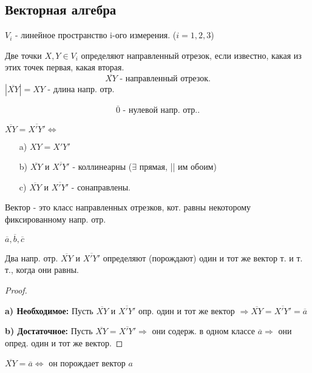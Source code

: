  \subsection{Векторная алгебра}
 
$V_i$ - линейное пространство  i-ого измерения. ($i = 1, 2, 3$)

\begin{definition}
Две точки $X, Y \in V_i$ определяют направленный отрезок, если известно, какая из этих точек первая, какая вторая.
\[
\overline{XY} \text{ - направленный отрезок}
.\] 
$|\overline{XY}| = XY$ - длина напр. отр.
\end{definition}
\begin{symb}
\[
\overline{0} \text{ - нулевой напр. отр.}
.\] 
\end{symb}

\begin{definition}
$\overline{XY} = \overline{X'Y'} \iff $
\begin{itemize}
    \item [a) ] $XY = X'Y'$
    \item [b) ] $\overline{XY}$ и $\overline{X'Y'}$ - коллинеарны ($\exists $ прямая, || им обоим)
    \item [c) ] $\overline{XY} \text{ и } \overline{X'Y'}$ - сонаправлены.
\end{itemize}
\end{definition}

\begin{definition}
Вектор - это класс направленных отрезков, кот. равны некоторому фиксированному напр. отр.
\end{definition}
\begin{symb}
    $\overline{a}, \overline{b}, \overline{c}$
\end{symb}

\begin{statement}
Два напр. отр. $\overline{XY}$ и $\overline{X'Y'}$ определяют (порождают) один и тот же вектор т. и т. т., когда они равны.
\end{statement}
\begin{proof}
~\newline

\textbf{a) Необходимое: } Пусть $\overline{XY}$ и $\overline{X'Y'}$ опр. один и тот же вектор $ \Rightarrow \overline{XY} = \overline{X'Y'} = \overline{a}$
 
\textbf{b) Достаточное: } Пусть $\overline{XY} = \overline{X'Y'} \Rightarrow $ они содерж. в одном классе $\overline{a} \Rightarrow $  они опред. один и тот же вектор.
\end{proof}
\begin{definition}
$\overline{XY} = \overline{a} \iff $ он порождает вектор $a$
\end{definition}

